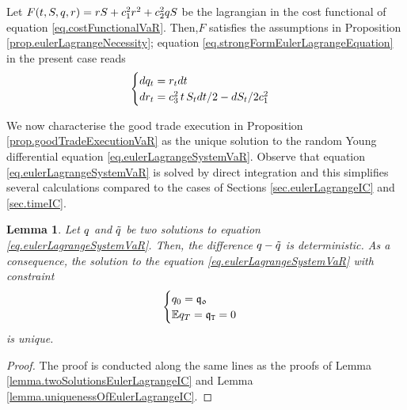 \documentclass[10pt,a4paper]{article}
\newtheorem{lemma}[thm]{Lemma}
\begin{document}
Let $F(t,S,q,r)= r S + c_{1}^{2} r^{2} + c_{2}^{2} q S$ be the lagrangian in the cost functional of equation \eqref{eq.costFunctionalVaR}. Then,$F$  satisfies the assumptions in Proposition \ref{prop.eulerLagrangeNecessity}; equation \eqref{eq.strongFormEulerLagrangeEquation} in the present case reads
\begin{equation}\label{eq.eulerLagrangeSystemVaR}
\begin{cases}
dq_t=r_{t} dt \\
dr_{t} = c_{3}^{2} \, t \, S_t dt/2 - dS_t / 2c_{1}^{2}
\end{cases}
\end{equation}

We now characterise the good trade execution in Proposition \ref{prop.goodTradeExecutionVaR} as the unique solution to the random Young differential equation \eqref{eq.eulerLagrangeSystemVaR}. Observe that equation \eqref{eq.eulerLagrangeSystemVaR} is solved by direct integration and this simplifies several calculations compared to the cases of Sections \ref{sec.eulerLagrangeIC} and \ref{sec.timeIC}. 

\begin{lemma}\label{lemma.uniquenessOfSolutionEulerLagrangeVaR}
	Let $q$ and $\tilde{q}$ be two solutions to equation \eqref{eq.eulerLagrangeSystemVaR}. Then, the difference $q - \tilde{q}$ is deterministic. As a consequence, the solution to the equation \eqref{eq.eulerLagrangeSystemVaR} with constraint
	\begin{equation}\label{eq.initialAndTerminalCOnditionsVaR}
	\begin{cases}
	q_0 = \mathfrak{q_0} \\
	\mathbb{{E}} q_T = \mathfrak{q}_{\mathtt{T} } = 0 
	\end{cases}
	\end{equation}
	is unique.
\end{lemma}
\begin{proof}
	The proof is conducted along the same lines as the proofs of Lemma \ref{lemma.twoSolutionsEulerLagrangeIC} and Lemma \ref{lemma.uniquenessOfEulerLagrangeIC}. 
\end{proof}
\end{document}

